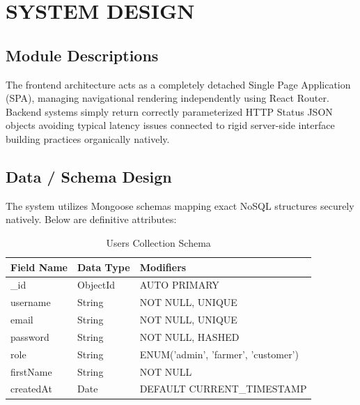 \documentclass[12pt,a4paper]{report}
\begin{document}
\chapter{SYSTEM DESIGN}
\section{Module Descriptions}
The frontend architecture acts as a completely detached Single Page Application (SPA), managing navigational rendering independently using React Router. Backend systems simply return correctly parameterized HTTP Status JSON objects avoiding typical latency issues connected to rigid server-side interface building practices organically natively.

\section{Data / Schema Design}
\renewcommand{\arraystretch}{1.5}

The system utilizes Mongoose schemas mapping exact NoSQL structures securely natively. Below are definitive attributes:

\vspace{0.4cm}
\begin{table}[htbp]
\centering
\begin{tabular}{|p{4cm}|p{3cm}|p{8cm}|}
\hline
\textbf{Field Name} & \textbf{Data Type} & \textbf{Modifiers} \\ \hline
\_id & ObjectId & AUTO PRIMARY \\ \hline
username & String & NOT NULL, UNIQUE \\ \hline
email & String & NOT NULL, UNIQUE \\ \hline
password & String & NOT NULL, HASHED \\ \hline
role & String & ENUM('admin', 'farmer', 'customer') \\ \hline
firstName & String & NOT NULL \\ \hline
createdAt & Date & DEFAULT CURRENT\_TIMESTAMP \\ \hline
\end{tabular}
\caption{Users Collection Schema}
\end{table}
\vspace{0.4cm}
\end{document}
